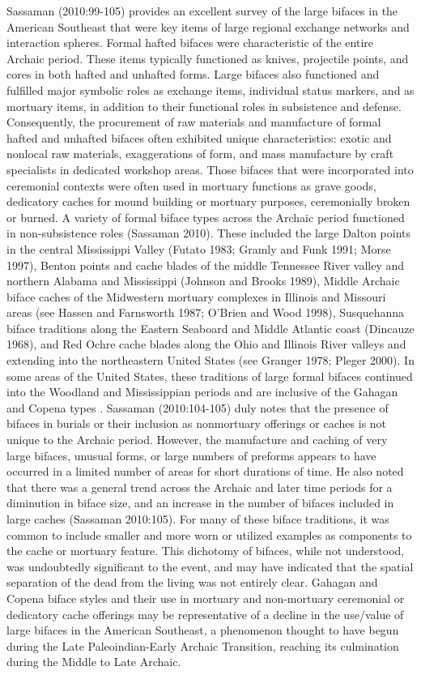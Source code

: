 \documentclass[]{interact}
\theoremstyle{plain}%
\theoremstyle{definition}
\theoremstyle{remark}
\begin{document}
Sassaman (2010:99-105) provides an excellent survey of the large bifaces
in the American Southeast that were key items of large regional exchange
networks and interaction spheres. Formal hafted bifaces were
characteristic of the entire Archaic period. These items typically
functioned as knives, projectile points, and cores in both hafted and
unhafted forms. Large bifaces also functioned and fulfilled major
symbolic roles as exchange items, individual status markers, and as
mortuary items, in addition to their functional roles in subsistence and
defense. Consequently, the procurement of raw materials and manufacture
of formal hafted and unhafted bifaces often exhibited unique
characteristics: exotic and nonlocal raw materials, exaggerations of
form, and mass manufacture by craft specialists in dedicated workshop
areas. Those bifaces that were incorporated into ceremonial contexts
were often used in mortuary functions as grave goods, dedicatory caches
for mound building or mortuary purposes, ceremonially broken or burned.
A variety of formal biface types across the Archaic period functioned in
non-subsistence roles (Sassaman 2010). These included the large Dalton
points in the central Mississippi Valley (Futato 1983; Gramly and Funk
1991; Morse 1997), Benton points and cache blades of the middle
Tennessee River valley and northern Alabama and Mississippi (Johnson and
Brooks 1989), Middle Archaic biface caches of the Midwestern mortuary
complexes in Illinois and Missouri areas (see Hassen and Farnsworth
1987; O'Brien and Wood 1998), Susquehanna biface traditions along the
Eastern Seaboard and Middle Atlantic coast (Dincauze 1968), and Red
Ochre cache blades along the Ohio and Illinois River valleys and
extending into the northeastern United States (see Granger 1978; Pleger
2000). In some areas of the United States, these traditions of large
formal bifaces continued into the Woodland and Mississippian periods and
are inclusive of the Gahagan and Copena types \citep{RN8154,RN8318}.
Sassaman (2010:104-105) duly notes that the presence of bifaces in
burials or their inclusion as nonmortuary offerings or caches is not
unique to the Archaic period. However, the manufacture and caching of
very large bifaces, unusual forms, or large numbers of preforms appears
to have occurred in a limited number of areas for short durations of
time. He also noted that there was a general trend across the Archaic
and later time periods for a diminution in biface size, and an increase
in the number of bifaces included in large caches (Sassaman 2010:105).
For many of these biface traditions, it was common to include smaller
and more worn or utilized examples as components to the cache or
mortuary feature. This dichotomy of bifaces, while not understood, was
undoubtedly significant to the event, and may have indicated that the
spatial separation of the dead from the living was not entirely clear.
Gahagan and Copena biface styles and their use in mortuary and
non-mortuary ceremonial or dedicatory cache offerings may be
representative of a decline in the use/value of large bifaces in the
American Southeast, a phenomenon thought to have begun during the Late
Paleoindian-Early Archaic Transition, reaching its culmination during
the Middle to Late Archaic.
\end{document}
